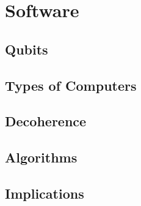 \section{Software}\label{SEC:software}

\subsection{Qubits}
\subsection{Types of Computers}
\subsection{Decoherence}
\subsection{Algorithms}
\subsection{Implications}